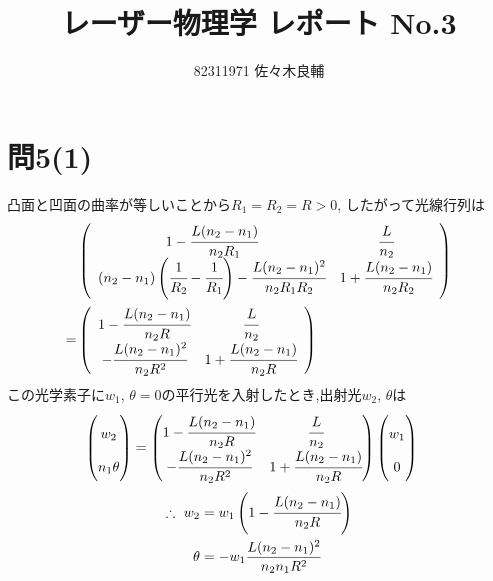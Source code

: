 \documentclass[uplatex,a4j,11pt,dvipdfmx]{jsarticle}
\begin{document}
\title{レーザー物理学 レポート No.3}
\author{82311971 佐々木良輔}
\date{}
\maketitle
\section*{問5(1)}
凸面と凹面の曲率が等しいことから$R_1=R_2=R>0$, したがって光線行列は
\begin{align}
  \begin{split}
    &\left(
      \begin{array}[2]{cc}
        1-\cfrac{L(n_2-n_1)}{n_2R_1}&\cfrac{L}{n_2}\\
        (n_2-n_1)\left(\cfrac{1}{R_2}-\cfrac{1}{R_1}\right)-\cfrac{L(n_2-n_1)^2}{n_2R_1R_2}&1+\cfrac{L(n_2-n_1)}{n_2R_2}
      \end{array}
    \right)\\
    =&\left(
      \begin{array}[2]{cc}
        1-\cfrac{L(n_2-n_1)}{n_2R}&\cfrac{L}{n_2}\\
        -\cfrac{L(n_2-n_1)^2}{n_2R^2}&1+\cfrac{L(n_2-n_1)}{n_2R}
      \end{array}
    \right)
  \end{split}
\end{align}
この光学素子に$w_1$, $\theta=0$の平行光を入射したとき,出射光$w_2$, $\theta$は
\begin{align*}
  \renewcommand\arraystretch{2}
  \begin{split}
    \begin{pmatrix}
      w_2\\n_1\theta
    \end{pmatrix}
    &=
    \begin{pmatrix}
      1-\cfrac{L(n_2-n_1)}{n_2R}&\cfrac{L}{n_2}\\
      -\cfrac{L(n_2-n_1)^2}{n_2R^2}&1+\cfrac{L(n_2-n_1)}{n_2R}
    \end{pmatrix}
    \begin{pmatrix}
      w_1\\0
    \end{pmatrix}
  \end{split}
\end{align*}
\begin{align}
  \begin{split}
    \therefore\ w_2&=w_1\left(1-\cfrac{L(n_2-n_1)}{n_2R}\right)\\
    \theta&=-w_1\frac{L(n_2-n_1)^2}{n_2n_1R^2}
  \end{split}
\end{align}
\end{document}
